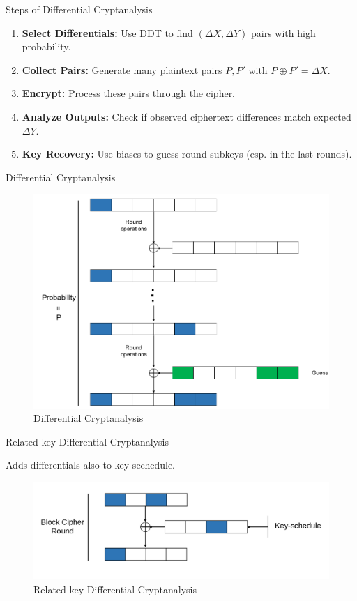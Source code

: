 \documentclass{beamer}
\begin{document}
\begin{frame}{Steps of Differential Cryptanalysis}
\begin{enumerate}
    \item \textbf{Select Differentials:}  
          Use DDT to find $(\Delta X, \Delta Y)$ pairs with high probability.  
    \item \textbf{Collect Pairs:}  
          Generate many plaintext pairs $P, P'$ with $P \oplus P' = \Delta X$.  
    \item \textbf{Encrypt:}  
          Process these pairs through the cipher.  
    \item \textbf{Analyze Outputs:}  
          Check if observed ciphertext differences match expected $\Delta Y$.  
    \item \textbf{Key Recovery:}  
          Use biases to guess round subkeys (esp. in the last rounds).  
\end{enumerate}
\end{frame}

\begin{frame}{Differential Cryptanalysis}
    

    \begin{figure}
        \centering
        \includegraphics[width=0.7\linewidth]{image.png}
        \caption{Differential Cryptanalysis}
        \label{fig:placeholder}
    \end{figure}
    
\end{frame}

\begin{frame}{Related-key Differential Cryptanalysis}

    Adds differentials also to key sechedule.  

    \begin{figure}
        \centering
        \includegraphics[width=0.7\linewidth]{fig/image.png}
        \caption{Related-key Differential Cryptanalysis}
        \label{fig:placeholder}
    \end{figure}
    
\end{frame}
\end{document}
